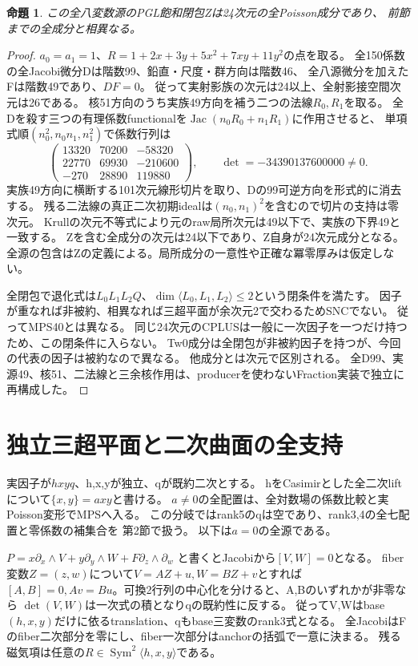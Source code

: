 \documentclass[a4paper,11pt]{ltjsarticle}
\newtheorem{proposition}{命題}[section]
\theoremstyle{definition}
\begin{document}
\begin{proposition}\label{prop:dependent-three-component}
この全八変数源のPGL飽和閉包Zは24次元の全Poisson成分であり、
前節までの全成分と相異なる。
\end{proposition}
\begin{proof}
$a_0=a_1=1$、$R=1+2x+3y+5x^2+7xy+11y^2$の点を取る。
全150係数の全Jacobi微分Dは階数99、鉛直・尺度・群方向は階数46、
全八源微分を加えたFは階数49であり、$DF=0$。
従って実射影族の次元は24以上、全射影接空間次元は26である。
核51方向のうち実族49方向を補う二つの法線$R_0,R_1$を取る。
全Dを殺す三つの有理係数functionalを$\operatorname{Jac}(n_0R_0+n_1R_1)$に作用させると、
単項式順$(n_0^2,n_0n_1,n_1^2)$で係数行列は
\[
 \begin{pmatrix}
 13320&70200&-58320\\22770&69930&-210600\\-270&28890&119880
 \end{pmatrix},\qquad\det=-34390137600000\ne0.
\]
実族49方向に横断する101次元線形切片を取り、Dの99可逆方向を形式的に消去する。
残る二法線の真正二次初期idealは$(n_0,n_1)^2$を含むので切片の支持は零次元。
Krullの次元不等式により元のraw局所次元は49以下で、実族の下界49と一致する。
Zを含む全成分の次元は24以下であり、Z自身が24次元成分となる。
全源の包含はZの定義による。局所成分の一意性や正確な冪零厚みは仮定しない。

全閉包で退化式は$L_0L_1L_2Q$、$\dim\langle L_0,L_1,L_2\rangle\le2$という閉条件を満たす。
因子が重なれば非被約、相異なれば三超平面が余次元2で交わるためSNCでない。
従ってMPS40とは異なる。
同じ24次元のCPLUSは一般に一次因子を一つだけ持つため、この閉条件に入らない。
Tw0成分は全閉包が非被約因子を持つが、今回の代表の因子は被約なので異なる。
他成分とは次元で区別される。
全D99、実源49、核51、二法線と三余核作用は、producerを使わないFraction実装で独立に再構成した。
\end{proof}

\section{独立三超平面と二次曲面の全支持}
実因子が$hxyq$、h,x,yが独立、qが既約二次とする。
hをCasimirとした全二次liftについて$\{x,y\}=axy$と書ける。
$a\ne0$の全配置は、全対数場の係数比較と実Poisson変形でMPSへ入る。
この分岐ではrank5のqは空であり、rank3,4の全七配置と零係数の補集合を
第2節で扱う。
以下は$a=0$の全源である。

$P=x\partial_x\wedge V+y\partial_y\wedge W+F\partial_z\wedge\partial_w$
と書くとJacobiから$[V,W]=0$となる。
fiber変数$Z=(z,w)$について$V=AZ+u,W=BZ+v$とすれば
$[A,B]=0,Av=Bu$。可換2行列の中心化を分けると、A,Bのいずれかが非零なら
$\det(V,W)$は一次式の積となりqの既約性に反する。
従ってV,Wはbase$(h,x,y)$だけに依るtranslation、qもbase三変数のrank3式となる。
全JacobiはFのfiber二次部分を零にし、fiber一次部分はanchorの括弧で一意に決まる。
残る磁気項は任意の$R\in\operatorname{Sym}^2\langle h,x,y\rangle$である。
\end{document}
